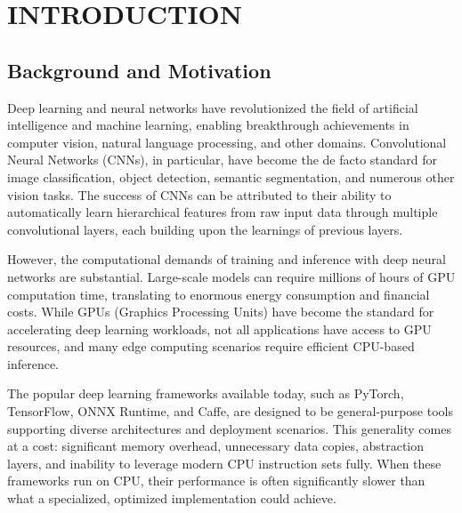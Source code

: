 \documentclass[12pt,oneside,a4paper]{report}
\renewcommand{\cftchapfont}{\normalfont\sffamily\color{black!85}}
\renewcommand{\cftchappagefont}{\normalfont\color{black!85}}
\begin{document}
\newpage

\setcounter{page}{1}

\addtocontents{toc}{\protect\renewcommand{\protect\cftchapfont}{\protect\bfseries\protect\color{mnPrimary}}}
\addtocontents{toc}{\protect\renewcommand{\protect\cftchappagefont}{\protect\bfseries\protect\color{mnPrimary}}}

\chapter{INTRODUCTION}
\setcounter{page}{1}

\section{Background and Motivation}

Deep learning and neural networks have revolutionized the field of artificial intelligence and machine learning, enabling breakthrough achievements in computer vision, natural language processing, and other domains. Convolutional Neural Networks (CNNs), in particular, have become the de facto standard for image classification, object detection, semantic segmentation, and numerous other vision tasks. The success of CNNs can be attributed to their ability to automatically learn hierarchical features from raw input data through multiple convolutional layers, each building upon the learnings of previous layers.

However, the computational demands of training and inference with deep neural networks are substantial. Large-scale models can require millions of hours of GPU computation time, translating to enormous energy consumption and financial costs. While GPUs (Graphics Processing Units) have become the standard for accelerating deep learning workloads, not all applications have access to GPU resources, and many edge computing scenarios require efficient CPU-based inference.

The popular deep learning frameworks available today, such as PyTorch, TensorFlow, ONNX Runtime, and Caffe, are designed to be general-purpose tools supporting diverse architectures and deployment scenarios. This generality comes at a cost: significant memory overhead, unnecessary data copies, abstraction layers, and inability to leverage modern CPU instruction sets fully. When these frameworks run on CPU, their performance is often significantly slower than what a specialized, optimized implementation could achieve.
\end{document}
